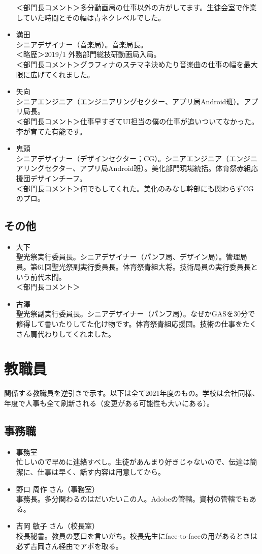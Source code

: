 \documentclass[a4paper]{ltjsreport}
\begin{document}
\begin{itemize}
        ＜部門長コメント＞多分動画局の仕事以外の方がしてます。生徒会室で作業していた時間とその幅は青ネクレベルでした。
  \item 満田\\
        シニアデザイナー（音楽局）。音楽局長。\\
        ＜略歴＞2019/1 外務部門総技研動画局入局。\\
        ＜部門長コメント＞グラフィナのステマネ決めたり音楽曲の仕事の幅を最大限に広げてくれました。
  \item 矢向\\
        シニアエンジニア（エンジニアリングセクター、アプリ局Android班）。アプリ局長。\\
        ＜部門長コメント＞仕事早すぎてUI担当の僕の仕事が追いついてなかった。李が育てた有能です。
  \item 鬼頭\\
        シニアデザイナー（デザインセクター；CG）。シニアエンジニア（エンジニアリングセクター、アプリ局Android班）。美化部門現場統括。体育祭赤組応援団デザインチーフ。\\
        ＜部門長コメント＞何でもしてくれた。美化のみなし幹部にも関わらずCGのプロ。
\end{itemize}
\subsection{その他}
\begin{itemize}
  \item 大下\\
        聖光祭実行委員長。シニアデザイナー（パンフ局、デザイン局）。管理局員。第61回聖光祭副実行委員長。体育祭青組大将。技術局員の実行委員長という前代未聞。\\
        ＜部門長コメント＞
  \item 古澤\\
        聖光祭副実行委員長。シニアデザイナー（パンフ局）。なぜかGASを30分で修得して書いたりしてた化け物です。体育祭青組応援団。技術の仕事をたくさん肩代わりしてくれました。
\end{itemize}
\section{教職員}
関係する教職員を逆引きで示す。以下は全て2021年度のもの。学校は会社同様、年度で人事も全て刷新される（変更がある可能性も大いにある）。
\subsection{事務職}
\begin{itemize}
  \item 事務室\\
        忙しいので早めに連絡すべし。生徒があんまり好きじゃないので、伝達は簡潔に、仕事は早く、話す内容は用意してから。
  \item 野口 周作 さん（事務室）\\
        事務長。多分関わるのはだいたいこの人。Adobeの管轄。資材の管轄でもある。
  \item 吉岡 敏子 さん（校長室）\\
        校長秘書。教員の悪口を言いがち。校長先生にface-to-faceの用があるときは必ず吉岡さん経由でアポを取る。
\end{itemize}
\end{document}
